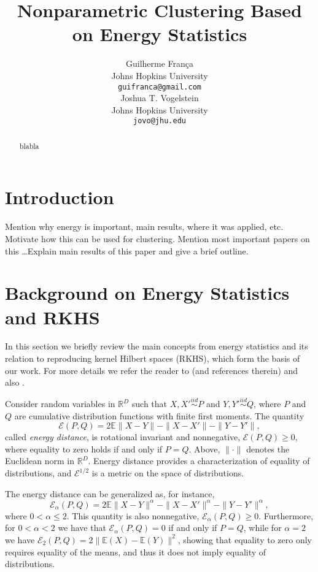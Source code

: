 \documentclass{article}
\title{Nonparametric Clustering Based on Energy Statistics}
\author{
Guilherme Fran\c ca \\
Johns Hopkins University\\
\texttt{guifranca@gmail.com} \\
\And
Joshua T. Vogelstein \\
Johns Hopkins University\\
\texttt{jovo@jhu.edu}
}
\newcommand\Energy{\mathcal{E}}
\newcommand\E{\mathbb{E}}
\begin{document}
\maketitle

\begin{abstract}
blabla
\end{abstract}



\section{Introduction}

Mention why energy is important, main results, where it was applied, etc.
Motivate how this can be used for clustering. Mention most important
papers on this \ldots Explain main results of this paper and give a brief
outline.


\section{Background on Energy Statistics and RKHS}
\label{sec:background}

In this section we briefly review the main concepts from energy
statistics and its relation to reproducing kernel Hilbert spaces 
(RKHS), which form the basis of our work.
For more details we refer the reader
to 
\cite{Szkely2013} 
(and references therein) and also \cite{Sejdinovic2013}.

Consider random variables in $\mathbb{R}^D$ 
such that $X,X' \stackrel{iid}{\sim} P$ and 
$Y,Y' \stackrel{iid}{\sim} Q$, where $P$ and $Q$ are cumulative
distribution functions with finite first moments. 
The quantity \cite{Szkely2013}
\begin{equation}\label{eq:energy}
\Energy(P, Q) = 2 \E \| X - Y\| - \| X - X' \| - \| Y - Y' \|,
\end{equation}
called \emph{energy distance}, 
is rotational invariant and nonnegative, $\Energy(P,Q) \ge 0$, where
equality
to zero holds if and only if $P = Q$.
Above, $\| \cdot \|$ denotes the
Euclidean norm in $\mathbb{R}^D$. 
Energy distance
provides a characterization of equality of distributions, and
$\Energy^{1/2}$ is
a metric on the space of distributions.

The energy distance can be generalized as, for instance,
\begin{equation}\label{eq:energy2}
\Energy_\alpha(P, Q) = 2 \E \| X - Y\|^{\alpha} - \| X - X' \|^{\alpha} - 
\| Y - Y' \|^{\alpha},
\end{equation}
where $0<\alpha\le 2$. This quantity is also nonnegative,
$\Energy_\alpha(P,Q) \ge 0$. Furthermore, for $0<\alpha<2$ we have that
$\Energy_\alpha(P,Q) = 0$ if and only if $P=Q$, while for $\alpha=2$ 
we have $\Energy_2(P,Q) = 2\| \E(X) - \E(Y) \|^2$, showing that
equality to zero only requires
equality of the means, and thus it does not imply equality of distributions.
\end{document}
